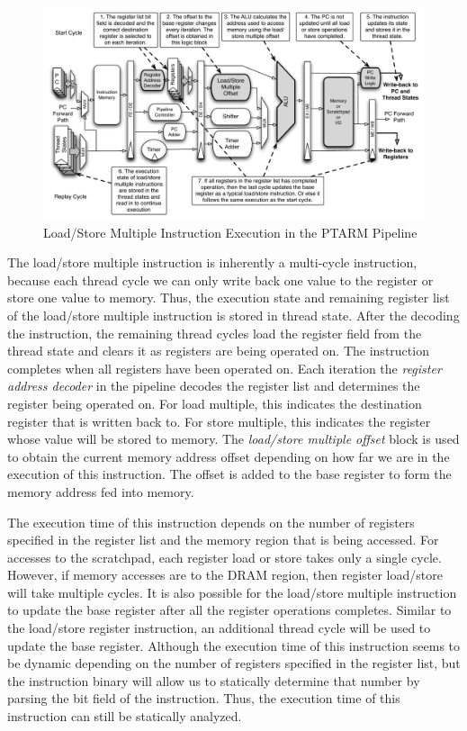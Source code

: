\begin{figure}
  \vspace{-20pt}
  \begin{center}
    \includegraphics[scale=.54]{figs/ldstrm_pipeline_implementation}
  \end{center}
  \vspace{-20pt}
  \caption{Load/Store Multiple Instruction Execution in the PTARM Pipeline}
  \label{fig:ldstrm_pipeline_implementation}
\end{figure}

The load/store multiple instruction is inherently a multi-cycle instruction, because each thread cycle we can only write back one value to the register or store one value to memory. 
Thus, the execution state and remaining register list of the load/store multiple instruction is stored in thread state.
After the decoding the instruction, the remaining thread cycles load the register field from the thread state and clears it as registers are being operated on. 
The instruction completes when all registers have been operated on.
Each iteration the \emph{register address decoder} in the pipeline decodes the register list and determines the register being operated on.
For load multiple, this indicates the destination register that is written back to.
For store multiple, this indicates the register whose value will be stored to memory.
The \emph{load/store multiple offset} block is used to obtain the current memory address offset depending on how far we are in the execution of this instruction.
The offset is added to the base register to form the memory address fed into memory.

The execution time of this instruction depends on the number of registers specified in the register list and the memory region that is being accessed. 
For accesses to the scratchpad, each register load or store takes only a single cycle. 
However, if memory accesses are to the DRAM region, then register load/store will take multiple cycles.
It is also possible for the load/store multiple instruction to update the base register after all the register operations completes. 
Similar to the load/store register instruction, an additional thread cycle will be used to update the base register.
Although the execution time of this instruction seems to be dynamic depending on the number of registers specified in the register list, but the instruction binary will allow us to statically determine that number by parsing the bit field of the instruction.
Thus, the execution time of this instruction can still be statically analyzed.   

